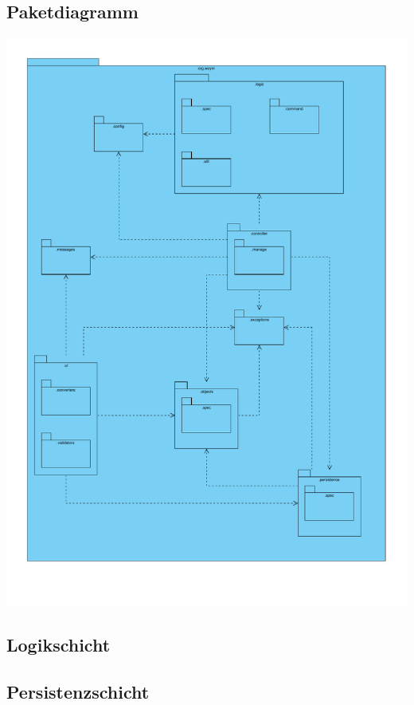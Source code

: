 \documentclass[fontsize=12pt,paper=a4,twoside]{scrartcl}
\begin{document}
\subsection{Paketdiagramm}
\includegraphics[width=\textwidth]{packages.pdf}


\subsection{Logikschicht}




\subsection{Persistenzschicht}
\end{document}
